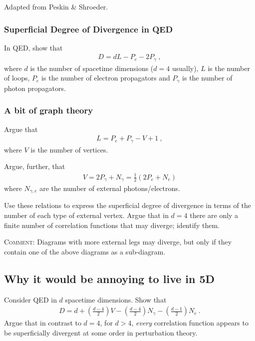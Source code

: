 \documentclass[12pt]{article}
\numberwithin{equation}{subsection}    %
\begin{document}
{\footnotesize Adapted from Peskin \& Shroeder.}

\subsubsection{Superficial Degree of Divergence in QED}

In QED, show that
\begin{align}
	D = dL - P_e - 2P_\gamma \ ,
\end{align}
where $d$ is the number of spacetime dimensions ($d=4$ usually), $L$ is the number of loops, $P_e$ is the number of electron propagators and $P_\gamma$ is the number of photon propagators.


\subsubsection{A bit of graph theory}

Argue that 
\begin{align}
	L = P_e + P_\gamma - V + 1 \ ,
\end{align}
where $V$ is the number of vertices. 

Argue, further, that
\begin{align}
	V = 2P_\gamma + N_\gamma = \frac{1}{2}(2P_e + N_e)
\end{align}
where $N_{\gamma,e}$ are the number of external photons/electrons.

Use these relations to express the superficial degree of divergence in terms of the number of each type of external vertex. Argue that in $d=4$ there are only a finite number of correlation functions that may diverge; identify them.

\textsc{Comment}: Diagrams with more external legs may diverge, but only if they contain one of the above diagrams as a sub-diagram.


\subsection{Why it would be annoying to live in 5D}


Consider QED in $d$ spacetime dimensions. Show that
\begin{align}
	D = d 
	+ \left(\frac{d-4}{2}\right) V
	- \left(\frac{d-4}{2}\right) N_\gamma
	- \left(\frac{d-1}{2}\right) N_e \ .
\end{align}
Argue that in contrast to $d=4$, for $d>4$, \emph{every} correlation function appears to be superficially divergent at some order in perturbation theory.
\end{document}
